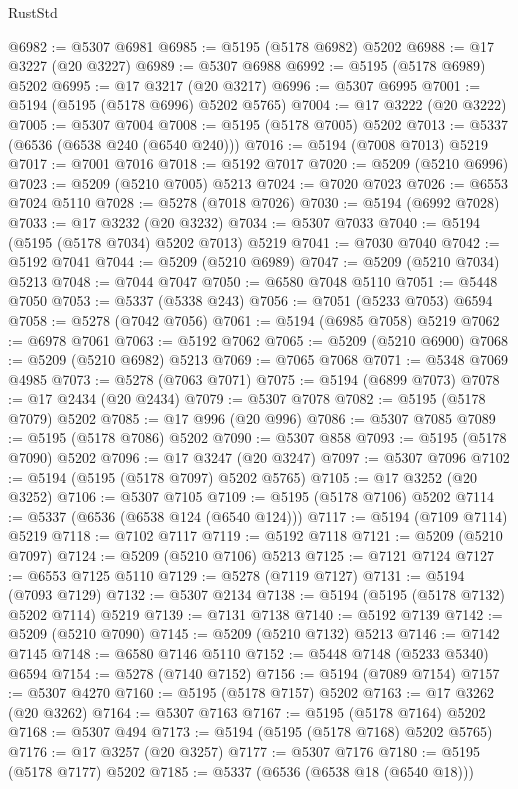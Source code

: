 \begin{lexlean}{RustStd}
\begin{coremodule}
@6982 := @5307 @6981
@6985 := @5195 (@5178 @6982) @5202
@6988 := @17 @3227 (@20 @3227)
@6989 := @5307 @6988
@6992 := @5195 (@5178 @6989) @5202
@6995 := @17 @3217 (@20 @3217)
@6996 := @5307 @6995
@7001 := @5194 (@5195 (@5178 @6996) @5202 @5765)
@7004 := @17 @3222 (@20 @3222)
@7005 := @5307 @7004
@7008 := @5195 (@5178 @7005) @5202
@7013 := @5337 (@6536 (@6538 @240 (@6540 @240)))
@7016 := @5194 (@7008 @7013) @5219
@7017 := @7001 @7016
@7018 := @5192 @7017
@7020 := @5209 (@5210 @6996)
@7023 := @5209 (@5210 @7005) @5213
@7024 := @7020 @7023
@7026 := @6553 @7024 @5110
@7028 := @5278 (@7018 @7026)
@7030 := @5194 (@6992 @7028)
@7033 := @17 @3232 (@20 @3232)
@7034 := @5307 @7033
@7040 := @5194 (@5195 (@5178 @7034) @5202 @7013) @5219
@7041 := @7030 @7040
@7042 := @5192 @7041
@7044 := @5209 (@5210 @6989)
@7047 := @5209 (@5210 @7034) @5213
@7048 := @7044 @7047
@7050 := @6580 @7048 @5110
@7051 := @5448 @7050
@7053 := @5337 (@5338 @243)
@7056 := @7051 (@5233 @7053) @6594
@7058 := @5278 (@7042 @7056)
@7061 := @5194 (@6985 @7058) @5219
@7062 := @6978 @7061
@7063 := @5192 @7062
@7065 := @5209 (@5210 @6900)
@7068 := @5209 (@5210 @6982) @5213
@7069 := @7065 @7068
@7071 := @5348 @7069 @4985
@7073 := @5278 (@7063 @7071)
@7075 := @5194 (@6899 @7073)
@7078 := @17 @2434 (@20 @2434)
@7079 := @5307 @7078
@7082 := @5195 (@5178 @7079) @5202
@7085 := @17 @996 (@20 @996)
@7086 := @5307 @7085
@7089 := @5195 (@5178 @7086) @5202
@7090 := @5307 @858
@7093 := @5195 (@5178 @7090) @5202
@7096 := @17 @3247 (@20 @3247)
@7097 := @5307 @7096
@7102 := @5194 (@5195 (@5178 @7097) @5202 @5765)
@7105 := @17 @3252 (@20 @3252)
@7106 := @5307 @7105
@7109 := @5195 (@5178 @7106) @5202
@7114 := @5337 (@6536 (@6538 @124 (@6540 @124)))
@7117 := @5194 (@7109 @7114) @5219
@7118 := @7102 @7117
@7119 := @5192 @7118
@7121 := @5209 (@5210 @7097)
@7124 := @5209 (@5210 @7106) @5213
@7125 := @7121 @7124
@7127 := @6553 @7125 @5110
@7129 := @5278 (@7119 @7127)
@7131 := @5194 (@7093 @7129)
@7132 := @5307 @2134
@7138 := @5194 (@5195 (@5178 @7132) @5202 @7114) @5219
@7139 := @7131 @7138
@7140 := @5192 @7139
@7142 := @5209 (@5210 @7090)
@7145 := @5209 (@5210 @7132) @5213
@7146 := @7142 @7145
@7148 := @6580 @7146 @5110
@7152 := @5448 @7148 (@5233 @5340) @6594
@7154 := @5278 (@7140 @7152)
@7156 := @5194 (@7089 @7154)
@7157 := @5307 @4270
@7160 := @5195 (@5178 @7157) @5202
@7163 := @17 @3262 (@20 @3262)
@7164 := @5307 @7163
@7167 := @5195 (@5178 @7164) @5202
@7168 := @5307 @494
@7173 := @5194 (@5195 (@5178 @7168) @5202 @5765)
@7176 := @17 @3257 (@20 @3257)
@7177 := @5307 @7176
@7180 := @5195 (@5178 @7177) @5202
@7185 := @5337 (@6536 (@6538 @18 (@6540 @18)))

\end{coremodule}
\end{lexlean}
